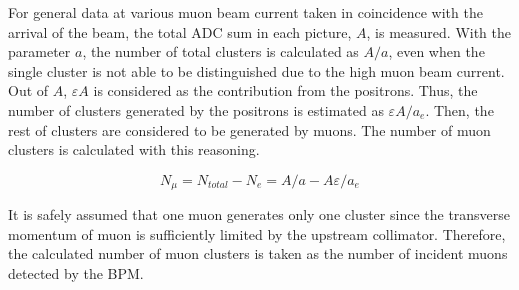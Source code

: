 \documentclass[preprint,3p,twocolumn]{elsarticle}
\begin{document}
For general data at various muon beam current taken in coincidence with the arrival of the beam, the total ADC sum in each picture, $A$, is measured. With the parameter $a$, the number of total clusters is calculated as $A/a$, even when the single cluster is not able to be distinguished due to the high muon beam current.
Out of $A$, $\varepsilon A$ is considered as the contribution from the positrons. Thus, the number of clusters generated by the positrons is estimated as $\varepsilon A/a_e$. Then, the rest of clusters are considered to be generated by muons. The number of muon clusters is calculated with this reasoning.
\newline
\begin{minipage}[h]{78mm}
{   \fontsize{9pt}{0}
	\setlength{\mathindent}{0pt}
	\setlength{\abovedisplayskip}{5pt}
	\setlength{\belowdisplayskip}{0pt}
	\begin{equation}
	N_{\mu}=N_{total}-N_{e}=A/a-A\varepsilon/a_e
	\end{equation}}
\end{minipage}
\newline
It is safely assumed that one muon generates only one cluster since the transverse momentum of muon is sufficiently limited by the upstream collimator. Therefore, the calculated number of muon clusters is taken as the number of incident muons detected by the BPM.
\end{document}
